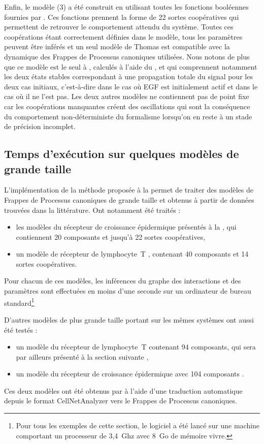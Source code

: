 Enfin, le modèle (3) a été construit en utilisant toutes les fonctions booléennes
fournies par .
Ces fonctions prennent la forme de 22 sortes coopératives qui permettent de retrouver
le comportement attendu du système.
Toutes ces coopérations étant correctement définies dans le modèle,
tous les paramètres peuvent être inférés et un seul modèle de Thomas est compatible
avec la dynamique des Frappes de Processus canoniques utilisées.
Nous notons de plus que ce modèle est le seul à ,
calculés à l'aide du ,
et qui comprennent notamment les deux états stables correspondant à une propagation
totale du signal pour les deux cas initiaux,
c'est-à-dire dans le cas où EGF est initialement actif et dans le cas où il ne l'est pas.
Les deux autres modèles ne contiennent pas de point fixe car les coopérations manquantes
créent des oscillations qui sont la conséquence du comportement non-déterministe
du formalisme lorsqu'on en reste à un stade de précision incomplet.

\subsection{Temps d'exécution sur quelques modèles de grande taille}

L'implémentation de la méthode proposée à la  permet de traiter
des modèles de
Frappes de Processus canoniques de grande taille et obtenus à partir de données
trouvées dans la littérature.
Ont notamment été traités :
\label{refmodels}
\begin{itemize}
  \item les modèles du récepteur de croissance épidermique présentés
    à la  \cite{Sahin09},
    qui contiennent 20 composants et jusqu'à 22 sortes coopératives,
  \item un modèle de récepteur de lymphocyte~T \cite{Klamt06},
    contenant 40 composants et 14 sortes coopératives.
\end{itemize}
Pour chacun de ces modèles, les inférences du graphe des interactions et des paramètres
sont effectuées en moins d'une seconde sur un ordinateur de bureau
standard\footnote{Pour tous les exemples de cette section,
le logiciel a été lancé sur une machine comportant
un processeur de 3,4~Ghz avec 8~Go de mémoire vivre.}

D'autres modèles de plus grande taille portant sur les mêmes systèmes ont aussi été testés :
\begin{itemize}
  \item un modèle du récepteur de lymphocyte~T contenant 94 composants,
    qui sera par ailleurs présenté à la section suivante \cite{SaezRodriguez2007},
  \item un modèle du récepteur de croissance épidermique avec 104 composants \cite{Samaga2009}.
\end{itemize}
Ces deux modèles ont été obtenus par  à l'aide d'une traduction
automatique depuis le format CellNetAnalyzer \cite{klamt2007structural}
vers le Frappes de Processus canoniques.

